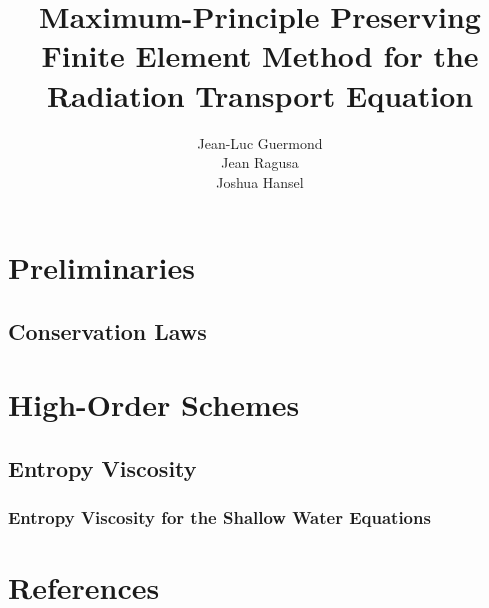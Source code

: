 \documentclass{mathnotes}
\title{Maximum-Principle Preserving Finite Element Method for the
  Radiation Transport Equation}
\author{Jean-Luc Guermond\\Jean Ragusa\\Joshua Hansel}
\begin{document}
\maketitle

\section{Preliminaries}
\subsection{Conservation Laws}
  
%    
%  
\section{High-Order Schemes}  
\subsection{Entropy Viscosity}
  \subsubsection{Entropy Viscosity for the Shallow Water Equations}
    

\section*{References}


\end{document}

